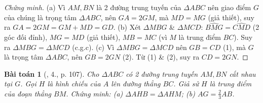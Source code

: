 \documentclass{article}
\newtheorem{baitoan}{Bài toán}
\begin{document}
\begin{proof}[Chứng minh]
	(a) Vì $AM,BN$ là 2 đường trung tuyến của $\Delta ABC$ nên giao điểm $G$ của chúng là trọng tâm $\Delta ABC$, nên $GA = 2GM$, mà $MD = MG$ (giả thiết), suy ra $GA = 2GM = GM + MD = GD$. (b) Xét $\Delta MBG$ \& $\Delta MCD$: $\widehat{BMG} = \widehat{CMD}$ (2 góc đối đỉnh), $MG = MD$ (giả thiết), $MB = MC$ (vì $M$ là trung điểm $BC$). Suy ra $\Delta MBG = \Delta MCD$ (c.g.c). (c) Vì $\Delta MBG = \Delta MCD$ nên $GB = CD$ (1), mà $G$ là trọng tâm $\Delta ABC$, nên $GB = 2GN$ (2). Từ (1) \& (2), suy ra $CD = 2GN$.
\end{proof}

\begin{baitoan}[\cite{SGK_Toan_7_Canh_Dieu_tap_2}, 4., p. 107]
	Cho $\Delta ABC$ có 2 đường trung tuyến $AM,BN$ cắt nhau tại $G$. Gọi $H$ là hình chiếu của $A$ lên đường thẳng $BC$. Giả sử $H$ là trung điểm của đoạn thẳng $BM$. Chứng minh: (a) $\Delta AHB = \Delta AHM$; (b) $AG = \frac{2}{3}AB$.
\end{baitoan}
\end{document}
